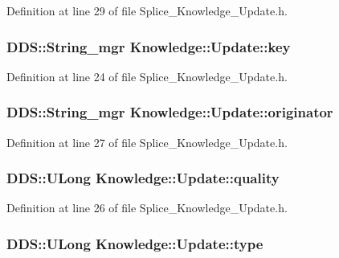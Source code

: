 Definition at line 29 of file Splice\_\-Knowledge\_\-Update.h.

\hypertarget{structKnowledge_1_1Update_a699402793204981538931d6c2eb1f8e4}{
\subsubsection[{key}]{\setlength{\rightskip}{0pt plus 5cm}DDS::String\_\-mgr {\bf Knowledge::Update::key}}}
\label{df/ddf/structKnowledge_1_1Update_a699402793204981538931d6c2eb1f8e4}


Definition at line 24 of file Splice\_\-Knowledge\_\-Update.h.

\hypertarget{structKnowledge_1_1Update_a885ad3fea98c3f1ab1e0a2d6f85c053c}{
\subsubsection[{originator}]{\setlength{\rightskip}{0pt plus 5cm}DDS::String\_\-mgr {\bf Knowledge::Update::originator}}}
\label{df/ddf/structKnowledge_1_1Update_a885ad3fea98c3f1ab1e0a2d6f85c053c}


Definition at line 27 of file Splice\_\-Knowledge\_\-Update.h.

\hypertarget{structKnowledge_1_1Update_acae49109e2f8977c025642710e04d080}{
\subsubsection[{quality}]{\setlength{\rightskip}{0pt plus 5cm}DDS::ULong {\bf Knowledge::Update::quality}}}
\label{df/ddf/structKnowledge_1_1Update_acae49109e2f8977c025642710e04d080}


Definition at line 26 of file Splice\_\-Knowledge\_\-Update.h.

\hypertarget{structKnowledge_1_1Update_a94b89c993c3748d01db522b124a16aa9}{
\subsubsection[{type}]{\setlength{\rightskip}{0pt plus 5cm}DDS::ULong {\bf Knowledge::Update::type}}}
\label{df/ddf/structKnowledge_1_1Update_a94b89c993c3748d01db522b124a16aa9}



